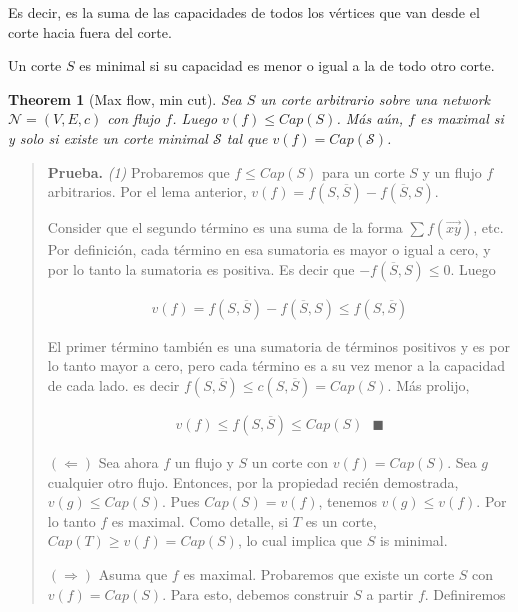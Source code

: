 \documentclass[a4paper]{article}
\newtheorem{theorem}{Theorem}
\newtheorem{theorem}{Theorem}
\begin{document}
Es decir, es la suma de las capacidades de todos los vértices que van desde el
corte hacia fuera del corte.

\begin{definition}
    Un corte $S$ es minimal si su capacidad es menor o igual a la de todo otro
    corte.
\end{definition}

\begin{theorem}[Max flow, min cut]
    Sea $S$ un corte arbitrario sobre una network $\mathcal{N} = (V, E, c)$ con
    flujo $f$. Luego $v(f) \leq Cap(S)$. Más aún, $f$ es maximal si y solo si
    existe un corte minimal $\mathcal{S}$ tal que $v(f) =
    Cap(\mathcal{S})$.
\end{theorem}


\small
\begin{quote}

\textbf{Prueba.} \textit{(1)} Probaremos que $f \leq Cap(S)$ para un corte $S$ y
un flujo $f$ arbitrarios. Por el lema anterior, $v(f) = f(S, \overline{S}) -
f(\overline{S}, S)$.

Consider que el segundo término es una suma de la forma $\sum
f(\overrightarrow{xy})$, etc. Por definición, cada término en esa sumatoria es
mayor o igual a cero, y por lo tanto la sumatoria es positiva. Es decir que
$-f(\overline{S}, S) \leq 0$. Luego 

\begin{align*}
    v(f) = f(S, \overline{S}) - f(\overline{S}, S) \leq f(S, \overline{S})
\end{align*}

El primer término también es una sumatoria de términos positivos y es por lo
tanto mayor a cero, pero cada término es a su vez menor a la capacidad de cada
lado. es decir $f(S, \overline{S}) \leq c(S, \overline{S}) = Cap(S)$. Más
prolijo, 

\begin{align*}
    v(f) \leq f(S, \overline{S}) \leq Cap(S) ~ ~ ~ \blacksquare
\end{align*}

$(\Leftarrow)$ Sea ahora $f$ un flujo y $S$ un corte con $v(f) = Cap(S)$. Sea
$g$ cualquier otro flujo. Entonces, por la propiedad recién demostrada, $v(g)
\leq Cap(S)$. Pues $Cap(S) = v(f)$, tenemos $v(g) \leq v(f)$. Por lo tanto $f$
es maximal. Como detalle, si $T$ es un corte, $Cap(T) \geq v(f) = Cap(S)$, lo
cual implica que $S$ is minimal.

$(\Rightarrow)$ Asuma que $f$ es maximal. Probaremos que existe un corte $S$ con
$v(f) = Cap(S)$. Para esto, debemos construir $S$ a partir $f$. Definiremos 


\end{quote}
\end{document}
